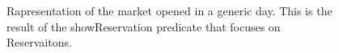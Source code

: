 \begin{figure}[H]
  \label{shorReserv}
  \caption{Rapresentation of the market opened in a generic day. This is the result of the showReservation predicate that focuses on Reservaitons.}
  \centering
    
\end{figure}

